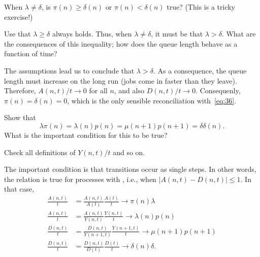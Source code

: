 \begin{exercise}{\faFlask}\label{ex:26}
  When $\lambda\neq \delta$, is $\pi(n)\geq \delta(n)$ or $\pi(n) < \delta(n)$ true?  (This is a tricky exercise!) 
  \begin{hint}
    Use that    $\lambda \geq \delta$ always holds. Thus, when $\lambda \neq \delta$, it must be that $\lambda > \delta$. What are the consequences of this inequality; how does the queue length behave as a function of time?
  \end{hint}
  \begin{solution}
    The assumptions lead us to conclude that $\lambda > \delta$. As a consequence, the queue length must increase on the long run (jobs come in faster than they leave). Therefore, $A(n,t)/t \to 0$ for all $n$, and also $D(n,t)/t\to 0$. Consequenly, $\pi(n) = \delta(n) = 0$, which is the only sensible reconciliation with~\eqref{eq:36}. 
  \end{solution}
\end{exercise}

\begin{exercise}
Show that 
\begin{equation*}
\lambda  \pi(n) = \lambda(n) p(n) = \mu(n+1) p(n+1) = \delta \delta(n).
\end{equation*}
What is the important condition for this to be true?
\begin{hint}
Check all definitions of $Y(n,t)/t$ and so on.
\end{hint}
\begin{solution}
  The important condition is that transitions occur as single
  steps. In other words, the relation is true for processes with
  , i.e., when $|A(n,t) - D(n,t)|\leq 1$.
  In  that case, 
\begin{align*}
  \frac{A(n,t)}{t} &=   \frac{A(n,t)}{A(t)} \frac{A(t)}{t} \to \pi(n) \lambda\\
  \frac{A(n,t)}{t} &=   \frac{A(n,t)}{Y(n,t)} \frac{Y(n,t)}{t} \to \lambda(n)p(n)\\
  \frac{D(n,t)}{t} &=   \frac{D(n,t)}{Y(n+1,t)} \frac{Y(n+1,t)}{t} \to \mu(n+1)p(n+1)\\
  \frac{D(n,t)}{t} &=   \frac{D(n,t)}{D(t)} \frac{D(t)}{t} \to \delta(n)\delta. \\
\end{align*}
\end{solution}
\end{exercise}




